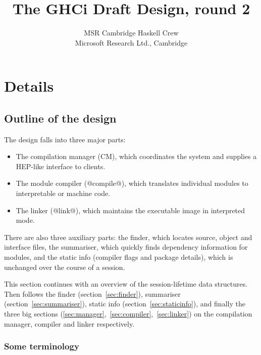 \documentclass[11pt]{article}
\begin{document}
\title{The GHCi Draft Design, round 2}
\author{MSR Cambridge Haskell Crew \\
        Microsoft Research Ltd., Cambridge}

\maketitle


\section{Details}

\subsection{Outline of the design}
\label{sec:details-intro}

The design falls into three major parts:
\begin{itemize}
\item The compilation manager (CM), which coordinates the 
      system and supplies a HEP-like interface to clients.
\item The module compiler (@compile@), which translates individual
      modules to interpretable or machine code.
\item The linker (@link@),
      which maintains the executable image in interpreted mode.
\end{itemize}

There are also three auxiliary parts: the finder, which locates
source, object and interface files, the summariser, which quickly
finds dependency information for modules, and the static info
(compiler flags and package details), which is unchanged over the
course of a session.

This section continues with an overview of the session-lifetime data
structures.  Then follows the finder (section~\ref{sec:finder}),
summariser (section~\ref{sec:summariser}), 
static info (section~\ref{sec:staticinfo}),
and finally the three big sections
(\ref{sec:manager},~\ref{sec:compiler},~\ref{sec:linker})
on the compilation manager, compiler and linker respectively.

\subsubsection*{Some terminology}
\end{document}
